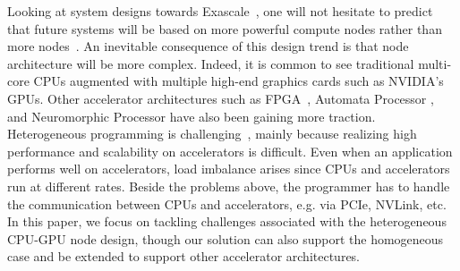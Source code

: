 Looking at system designs towards Exascale~\cite{top500}, one will not hesitate to predict that future systems will be based on more powerful compute nodes rather than more nodes~\cite{Shalf:exascaleChallenges}.  
An inevitable consequence of this design trend is that node architecture will be more complex.
Indeed, it is common to see traditional multi-core CPUs augmented with multiple high-end graphics cards such as NVIDIA's GPUs.
Other accelerator architectures such as FPGA~\cite{Chen:Eyeriss}, Automata Processor \cite{Fang:UAP}, and Neuromorphic Processor \cite{kim:neuromorphic} have also been gaining more traction.
Heterogeneous programming is challenging~\cite{exascaleRoadMap}, mainly because realizing high performance and scalability on accelerators is difficult.
Even when an application performs well on accelerators, load imbalance arises since CPUs and accelerators run at different rates.
Beside the problems above, the programmer has to handle the communication between CPUs and accelerators, e.g. via PCIe, NVLink, etc.
In this paper, we focus on tackling challenges associated with the heterogeneous CPU-GPU node design, though our solution can also support the homogeneous case and be extended to support other accelerator architectures.




